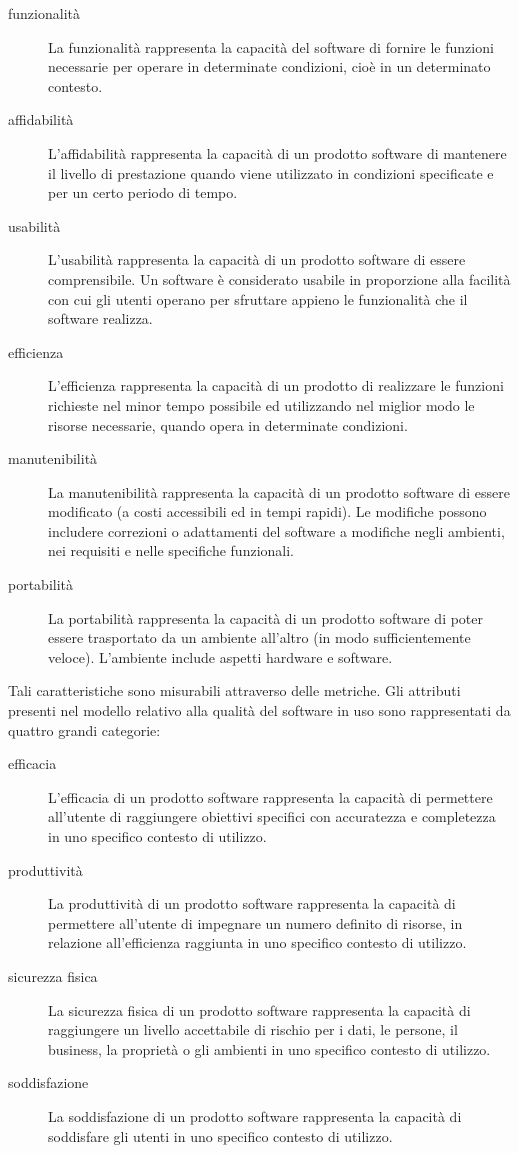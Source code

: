 			\begin{description}
				\item[funzionalità] La funzionalità rappresenta la capacità del software di fornire le funzioni necessarie per operare in determinate condizioni, cioè in un determinato contesto.
				\item[affidabilità] L'affidabilità rappresenta la capacità di un prodotto software di mantenere il livello di prestazione quando viene utilizzato in condizioni specificate e per un certo periodo di tempo.
				\item[usabilità] L'usabilità rappresenta la capacità di un prodotto software di essere comprensibile. Un software è considerato usabile in proporzione alla facilità con cui gli utenti operano per sfruttare appieno le funzionalità che il software realizza.
				\item[efficienza] L'efficienza rappresenta la capacità di un prodotto di realizzare le funzioni richieste nel minor tempo possibile ed utilizzando nel miglior modo le risorse necessarie, quando opera in determinate condizioni.
				\item[manutenibilità] La manutenibilità rappresenta la capacità di un prodotto software di essere modificato (a costi accessibili ed in tempi rapidi). Le modifiche possono includere correzioni o adattamenti del software a modifiche negli ambienti, nei requisiti e nelle specifiche funzionali.
				\item[portabilità] La portabilità rappresenta la capacità di un prodotto software di poter essere trasportato da un ambiente all'altro (in modo sufficientemente veloce). L'ambiente include aspetti hardware e software.
			\end{description}
			Tali caratteristiche sono misurabili attraverso delle metriche.
			Gli attributi presenti nel modello relativo alla qualità del software in uso sono rappresentati da quattro grandi categorie:
			\begin{description}
				\item[efficacia] L'efficacia di un prodotto software rappresenta la capacità di permettere all'utente di raggiungere obiettivi specifici con accuratezza e completezza in uno specifico contesto di utilizzo.
				\item[produttività] La produttività di un prodotto software rappresenta la capacità di permettere all'utente di impegnare un numero definito di risorse, in relazione all'efficienza raggiunta in uno specifico contesto di utilizzo.
				\item[sicurezza fisica] La sicurezza fisica di un prodotto software rappresenta la capacità di raggiungere un livello accettabile di rischio per i dati, le persone, il business, la proprietà o gli ambienti in uno specifico contesto di utilizzo.
				\item[soddisfazione] La soddisfazione di un prodotto software rappresenta la capacità di soddisfare gli utenti in uno specifico contesto di utilizzo.
			\end{description}
